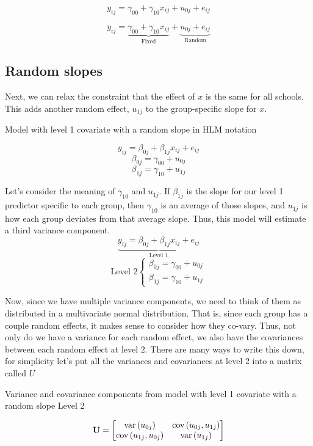 \[
y_{ij} = \gamma_{00}+\gamma_{10}x_{ij}+u_{0j}+e_{ij}
\]

\[
y_{ij} = \underbrace{\gamma_{00}+\gamma_{10}x_{ij}}_{\text{Fixed}}+\underbrace{u_{0j}+e_{ij}}_{\text{Random}}
\]

\subsection{Random slopes}

Next, we can relax the constraint that the effect of $x$ is the same for all schools. This adds another random effect, $u_{1j}$ to the group-specific slope for $x$.

Model with level 1 covariate with a random slope in HLM notation

\[
y_{ij} = \beta_{0j}+\beta_{1j}x_{ij}+e_{ij}
\]
\[
\beta_{0j} = \gamma_{00}+u_{0j}
\]
\[
\beta_{1j} = \gamma_{10}+u_{1j}
\]

Let's consider the meaning of $\gamma_{10}$ and $u_{1j}$. If $\beta_{1j}$ is the slope for our level 1 predictor specific to each group, then $\gamma_{10}$ is an average of those slopes, and $u_{1j}$ is how each group deviates from that average slope. Thus, this model will estimate a third variance component.
\[
\underbrace{y_{ij} = \beta_{0j}+\beta_{1j}x_{ij}+e_{ij}}_{\text{Level 1}}
\]
\[
\mbox{Level 2}
\begin{cases}
    \beta_{0j} = \gamma_{00}+u_{0j}  \\
    \beta_{1j} = \gamma_{10}+u_{1j}
\end{cases}
\]

Now, since we have multiple variance components, we need to think of them as distributed in a multivariate normal distribution. That is, since each group has a couple random effects, it makes sense to consider how they co-vary. Thus, not only do we have a variance for each random effect, we also have the covariances between each random effect at level 2. There are many ways to write this down, for simplicity let's put all the variances and covariances at level 2 into a matrix called $U$

Variance and covariance components from model with level 1 covariate with a random slope
Level 2

\[
\mbox{\textbf{U}} =
\begin{bmatrix}
	\mbox{var}\left(u_{0j}\right) & \mbox{cov}\left(u_{0j},u_{1j}\right) \\
	\mbox{cov}\left(u_{1j},u_{0j}\right) & \mbox{var}\left(u_{1j}\right)
\end{bmatrix}
\]

